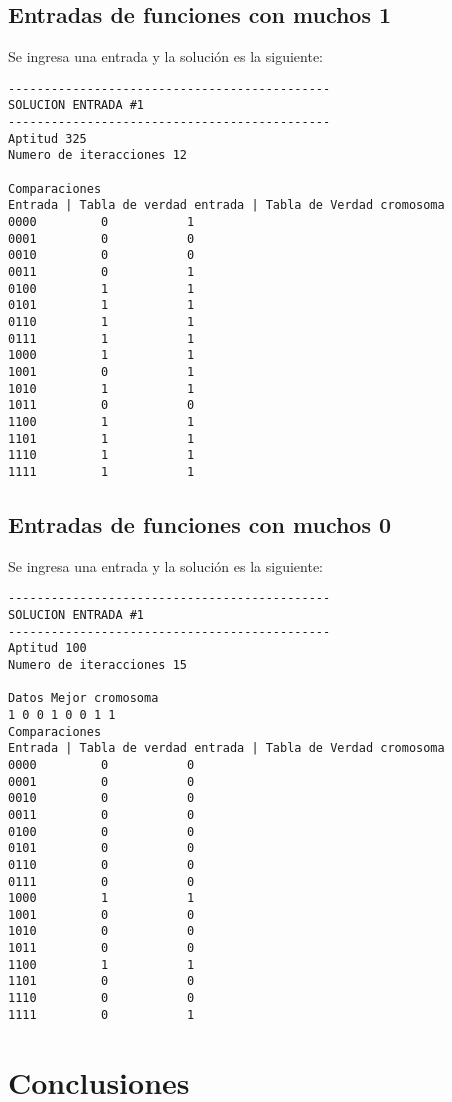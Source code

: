 \documentclass[letter]{article}
\begin{document}
\subsection{Entradas de funciones con muchos 1}

Se ingresa una entrada y la solución es la siguiente:

\lstset{frameround=fttt}
\begin{lstlisting}[frame=trBL]
---------------------------------------------
SOLUCION ENTRADA #1
---------------------------------------------
Aptitud 325
Numero de iteracciones 12

Comparaciones
Entrada | Tabla de verdad entrada | Tabla de Verdad cromosoma
0000 		 0 			 1
0001 		 0 			 0
0010 		 0 			 0
0011 		 0 			 1
0100 		 1 			 1
0101 		 1 			 1
0110 		 1 			 1
0111 		 1 			 1
1000 		 1 			 1
1001 		 0 			 1
1010 		 1 			 1
1011 		 0 			 0
1100 		 1 			 1
1101 		 1 			 1
1110 		 1 			 1
1111 		 1 			 1
\end{lstlisting}

\subsection{Entradas de funciones con muchos 0}

Se ingresa una entrada y la solución es la siguiente:

\lstset{frameround=fttt}
\begin{lstlisting}[frame=trBL]
---------------------------------------------
SOLUCION ENTRADA #1
---------------------------------------------
Aptitud 100
Numero de iteracciones 15

Datos Mejor cromosoma
1 0 0 1 0 0 1 1 
Comparaciones
Entrada | Tabla de verdad entrada | Tabla de Verdad cromosoma
0000 		 0 			 0
0001 		 0 			 0
0010 		 0 			 0
0011 		 0 			 0
0100 		 0 			 0
0101 		 0 			 0
0110 		 0 			 0
0111 		 0 			 0
1000 		 1 			 1
1001 		 0 			 0
1010 		 0 			 0
1011 		 0 			 0
1100 		 1 			 1
1101 		 0 			 0
1110 		 0 			 0
1111 		 0 			 1
\end{lstlisting}

\section{Conclusiones}
\end{document}
